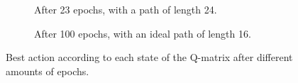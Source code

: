\vspace{-13pt}

\renewcommand{\textuparrow}{\ensuremath{\upa{}}}
\renewcommand{\textdownarrow}{\ensuremath{\downa{}}}
\renewcommand{\textleftarrow}{\ensuremath{\lefta{}}}
\renewcommand{\textrightarrow}{\ensuremath{\righta{}}}
\begin{figure}[H]
	\centering
	\begin{subfigure}{.42\textwidth}
		\caption{After 23 epochs, with a path of length 24.}
	\end{subfigure}
	\begin{subfigure}{.42\textwidth}
		\caption{After 100 epochs, with an ideal path of length 16.}
	\end{subfigure}
	\caption{Best action according to each state of the Q-matrix after different amounts of epochs.}
\end{figure}
